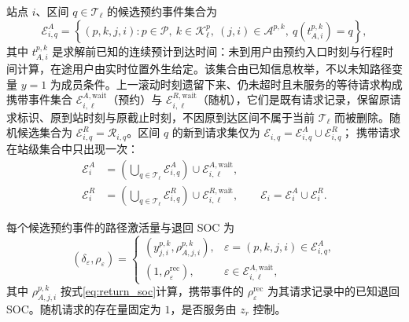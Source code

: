 \documentclass[12pt,a4paper,UTF8]{ctexart}
\begin{document}
站点 $i$、区间 $q\in\mathcal T_\ell$ 的候选预约事件集合为
\begin{equation}
\mathcal E_{i,q}^{A}
=
\left\{(p,k,j,i):p\in\mathcal P,\ k\in\mathcal K_\ell^p,
\ (j,i)\in\mathcal A^{p,k},
\ q(t_{A,i}^{p,k})=q\right\},
\label{eq:swap_event_sets}
\end{equation}
其中 $t_{A,i}^{p,k}$ 是求解前已知的连续预计到达时间：未到用户由预约入口时刻与行程时间计算，在途用户由实时位置外生给定。该集合由已知信息枚举，不以未知路径变量 $y=1$ 为成员条件。上一滚动时刻遗留下来、仍未超时且未服务的等待请求构成携带事件集合 $\mathcal E_{i,\ell}^{A,\mathrm{wait}}$（预约）与 $\mathcal E_{i,\ell}^{R,\mathrm{wait}}$（随机），它们是既有请求记录，保留原请求标识、原到站时刻与原截止时刻，不因原到达区间不属于当前 $\mathcal T_\ell$ 而被删除。随机候选集合为 $\mathcal E_{i,q}^{R}=\mathcal R_{i,q}$。区间 $q$ 的新到请求集仅为
$\mathcal E_{i,q}=\mathcal E_{i,q}^{A}\cup\mathcal E_{i,q}^{R}$；
携带请求在站级集合中只出现一次：
\begin{equation}
\begin{aligned}
\mathcal E_i^A
&=\left(\bigcup_{q\in\mathcal T_\ell}\mathcal E_{i,q}^A\right)
\cup\mathcal E_{i,\ell}^{A,\mathrm{wait}},\\
\mathcal E_i^R
&=\left(\bigcup_{q\in\mathcal T_\ell}\mathcal E_{i,q}^R\right)
\cup\mathcal E_{i,\ell}^{R,\mathrm{wait}},
\qquad
\mathcal E_i=\mathcal E_i^A\cup\mathcal E_i^R.
\end{aligned}
\label{eq:station_event_union}
\end{equation}

每个候选预约事件的路径激活量与退回 SOC 为
\begin{equation}
(\delta_\varepsilon,\rho_\varepsilon)=
\begin{cases}
(y_{j,i}^{p,k},\rho_{A,j,i}^{p,k}),
&\varepsilon=(p,k,j,i)\in\mathcal E_{i,q}^{A},\\
(1,\rho_\varepsilon^{\mathrm{rec}}),
&\varepsilon\in\mathcal E_{i,\ell}^{A,\mathrm{wait}},
\end{cases}
\label{eq:event_activation_and_soc}
\end{equation}
其中 $\rho_{A,j,i}^{p,k}$ 按式\eqref{eq:return_soc}计算，携带事件的 $\rho_\varepsilon^{\mathrm{rec}}$ 为其请求记录中的已知退回 SOC。随机请求的存在量固定为 $1$，是否服务由 $z_r$ 控制。
\end{document}
